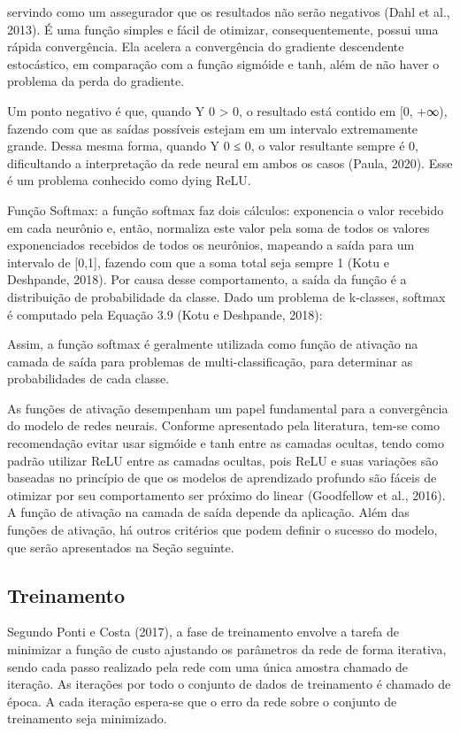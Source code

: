 servindo como um assegurador que os resultados não serão negativos (Dahl et al., 2013). É uma função simples e fácil de otimizar, consequentemente, possui uma rápida convergência. Ela acelera a convergência do gradiente descendente estocástico, em comparação com a função sigmóide e tanh, além de não haver o problema da perda do gradiente.

Um ponto negativo é que, quando Y 0 > 0, o resultado está contido em [0, +∞), fazendo com que as saídas possíveis estejam em um intervalo extremamente grande. Dessa mesma forma, quando Y 0 ≤ 0, o valor resultante sempre é 0, dificultando a interpretação da rede neural em ambos os casos (Paula, 2020). Esse é um problema conhecido como dying ReLU.

Função Softmax: a função softmax faz dois cálculos: exponencia o valor recebido em cada neurônio e, então, normaliza este valor pela soma de todos os valores exponenciados recebidos de todos os neurônios, mapeando a saída para um intervalo de [0,1], fazendo com que a soma total seja sempre 1 (Kotu e Deshpande, 2018). Por causa desse comportamento, a saída da função é a distribuição de probabilidade da classe. Dado um problema de k-classes, softmax é computado pela Equação 3.9 (Kotu e Deshpande, 2018):

Assim, a função softmax é geralmente utilizada como função de ativação na camada de saída para problemas de multi-classificação, para determinar as probabilidades de cada classe.

As funções de ativação desempenham um papel fundamental para a convergência do modelo de redes neurais. Conforme apresentado pela literatura, tem-se como recomendação evitar usar sigmóide e tanh entre as camadas ocultas, tendo como padrão utilizar ReLU entre as camadas ocultas, pois ReLU e suas variações são baseadas no princípio de que os modelos de aprendizado profundo são fáceis de otimizar por seu comportamento ser próximo do linear (Goodfellow et al., 2016). A função de ativação na camada de saída depende da aplicação. Além das funções de ativação, há outros critérios que podem definir o sucesso do modelo, que serão apresentados na Seção seguinte.


\subsection{Treinamento}

Segundo Ponti e Costa (2017), a fase de treinamento envolve a tarefa de minimizar a função de custo ajustando os parâmetros da rede de forma iterativa, sendo cada passo realizado pela rede com uma única amostra chamado de iteração. As iterações por todo o conjunto de dados de treinamento é chamado de época. A cada iteração espera-se que o erro da rede sobre o conjunto de treinamento seja minimizado.


